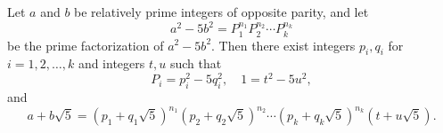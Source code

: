 Let $a$ and $b$ be relatively prime integers of opposite parity, and let
$$a^2 - 5b^2 = P_1^{n_1} P_2^{n_2} \cdots P_k^{n_k}$$
be the prime factorization of $a^2 - 5b^2$. Then there exist integers $p_i, q_i$ for $i = 1, 2, \ldots, k$ and integers $t, u$ such that
$$P_i = p_i^2 - 5q_i^2, \quad 1 = t^2 - 5u^2,$$
and
$$a + b\sqrt{5} = (p_1 + q_1\sqrt{5})^{n_1} (p_2 + q_2\sqrt{5})^{n_2} \cdots (p_k + q_k\sqrt{5})^{n_k} (t + u\sqrt{5}).$$
